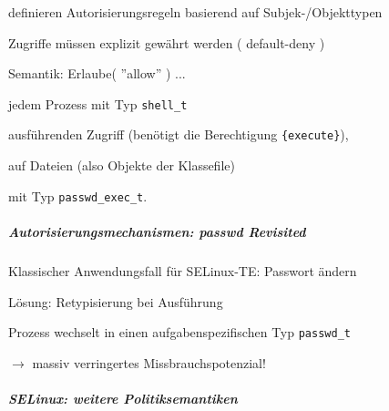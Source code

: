 \documentclass[a4paper]{article}
\begin{document}
\begin{multicols}{3}
    \begin{itemize*}
        \item
        definieren Autorisierungsregeln basierend auf Subjek-/Objekttypen
        \item
        Zugriffe müssen explizit gewährt werden ( default-deny )

        \item
        Semantik: Erlaube( ''allow'' ) ...
        \begin{itemize*}
            \item jedem Prozess mit Typ \texttt{shell\_t}
            \item ausführenden Zugriff (benötigt die Berechtigung \texttt{\{execute\}}),
            \item auf Dateien (also Objekte der Klassefile)
            \item mit Typ \texttt{passwd\_exec\_t}.
        \end{itemize*}
    \end{itemize*}


    \subparagraph{Autorisierungsmechanismen: passwd
        Revisited}

    Klassischer Anwendungsfall für SELinux-TE: Passwort ändern

    Lösung: Retypisierung bei Ausführung

    \begin{itemize*}
        \item
        Prozess wechselt in einen aufgabenspezifischen Typ \texttt{passwd\_t}
        \item
        $\rightarrow$ massiv verringertes
        Missbrauchspotenzial!
        \item
    \end{itemize*}


    \subparagraph{SELinux: weitere
        Politiksemantiken}


\end{multicols}
\end{document}
